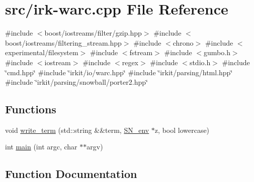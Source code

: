 \hypertarget{irk-warc_8cpp}{}\section{src/irk-\/warc.cpp File Reference}
\label{irk-warc_8cpp}
{\ttfamily \#include $<$boost/iostreams/filter/gzip.\+hpp$>$}\newline
{\ttfamily \#include $<$boost/iostreams/filtering\+\_\+stream.\+hpp$>$}\newline
{\ttfamily \#include $<$chrono$>$}\newline
{\ttfamily \#include $<$experimental/filesystem$>$}\newline
{\ttfamily \#include $<$fstream$>$}\newline
{\ttfamily \#include $<$gumbo.\+h$>$}\newline
{\ttfamily \#include $<$iostream$>$}\newline
{\ttfamily \#include $<$regex$>$}\newline
{\ttfamily \#include $<$stdio.\+h$>$}\newline
{\ttfamily \#include \char`\"{}cmd.\+hpp\char`\"{}}\newline
{\ttfamily \#include \char`\"{}irkit/io/warc.\+hpp\char`\"{}}\newline
{\ttfamily \#include \char`\"{}irkit/parsing/html.\+hpp\char`\"{}}\newline
{\ttfamily \#include \char`\"{}irkit/parsing/snowball/porter2.\+hpp\char`\"{}}\newline
\subsection*{Functions}
\begin{DoxyCompactItemize}
\item 
void \mbox{\hyperlink{irk-warc_8cpp_a44adaf0886fa4ffc57f8ea4447218597}{write\+\_\+term}} (std\+::string \&\&term, \mbox{\hyperlink{structSN__env}{S\+N\+\_\+env}} $\ast$z, bool lowercase)
\item 
int \mbox{\hyperlink{irk-warc_8cpp_a3c04138a5bfe5d72780bb7e82a18e627}{main}} (int argc, char $\ast$$\ast$argv)
\end{DoxyCompactItemize}


\subsection{Function Documentation}
\mbox{\label{irk-warc_8cpp_a3c04138a5bfe5d72780bb7e82a18e627}} 
